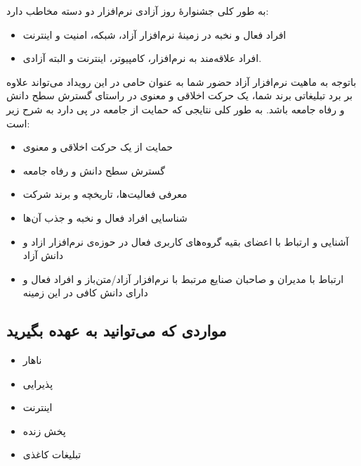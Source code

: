 \documentclass{article}
\begin{document}
\begin{flushright}

به طور کلی جشنوارهٔ روز‌ آزادی نرم‌افزار دو دسته مخاطب دارد:
\begin{itemize}
\item افراد فعال و نخبه در زمینهٔ نرم‌افزار آزاد، شبکه، امنیت و اینترنت
\item افراد علاقه‌مند به نرم‌افزار، کامپیوتر، اینترنت و البته آزادی.
\end{itemize}

\end{flushright}
\begin{flushright}

باتوجه به ماهیت نرم‌افزار آزاد حضور شما به عنوان حامی در این رویداد می‌تواند علاوه‌ بر برد تبلیغاتی برند شما، یک حرکت اخلاقی و معنوی در راستای گسترش سطح دانش و رفاه جامعه باشد. به طور کلی نتایجی که حمایت از جامعه در پی دارد به شرح زیر است:
\begin{itemize}
\item حمایت از یک حرکت اخلاقی و معنوی
\item گسترش سطح دانش و رفاه جامعه
\item معرفی فعالیت‌ها، تاریخچه و برند شرکت
\item شناسایی افراد فعال و نخبه و جذب آن‌ها
\item آشنایی و ارتباط با اعضای بقیه گروه‌های کاربری فعال در حوزه‌ی نرم‌افزار ازاد و دانش آزاد
\item ارتباط با مدیران و صاحبان صنایع مرتبط با نرم‌افزار آزاد/متن‌باز و افراد فعال و دارای دانش کافی در این زمینه
\end{itemize}

\end{flushright}

\subsection{مواردی که می‌توانید به عهده بگیرید}


\begin{flushright}

\begin{itemize}
\item ناهار
\item پذیرایی
\item اینترنت
\item پخش زنده
\item تبلیغات کاغذی
\end{itemize}

\end{flushright}
\end{document}
